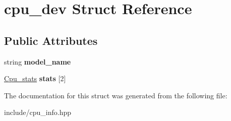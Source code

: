 \hypertarget{structcpu__dev}{}\section{cpu\+\_\+dev Struct Reference}
\label{structcpu__dev}
\subsection*{Public Attributes}
\begin{DoxyCompactItemize}
\item 
\mbox{\label{structcpu__dev_a09ac88f30780b2ec325042a6a7341d0c}} 
string {\bfseries model\+\_\+name}
\item 
\mbox{\label{structcpu__dev_a13407ba25f8362ccd7a855a6cbd00e01}} 
\mbox{\hyperlink{structcpu__stats}{Cpu\+\_\+stats}} {\bfseries stats} \mbox{[}2\mbox{]}
\end{DoxyCompactItemize}


The documentation for this struct was generated from the following file\+:\begin{DoxyCompactItemize}
\item 
include/cpu\+\_\+info.\+hpp\end{DoxyCompactItemize}
